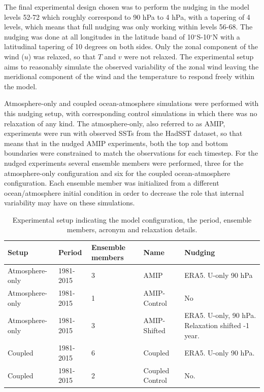 
The final experimental design chosen was to perform the nudging in the model levels 52-72 which roughly correspond to 90 hPa to 4 hPa, with a tapering of 4 levels, which means that full nudging was only working within levels 56-68. The nudging was done at all longitudes in the latitude band of 10$^\circ$S-10$^\circ$N with a latitudinal tapering of 10 degrees on both sides. Only the zonal component of the wind ($u$) was relaxed, so that $T$ and $v$ were not relaxed. 
The experimental setup aims to reasonably simulate the observed variability of the zonal wind leaving the meridional component of the wind and the temperature to respond freely within the model. 

Atmosphere-only and coupled ocean-atmosphere simulations were performed with this nudging setup, with corresponding control simulations in which there was no relaxation of any kind. The atmosphere-only, also referred to as AMIP, experiments were run with observed SSTs from the HadSST dataset, so that means that in the nudged AMIP experiments, both the top and bottom boundaries were constrained to match the observations for each timestep. 
For the nudged experiments several ensemble members were performed, three for the atmosphere-only configuration and six for the coupled ocean-atmosphere configuration. Each ensemble member was initialized from a different ocean/atmosphere initial condition in order to decrease the role that internal variability may have on these simulations. 

\begin{table}[t!]
\caption{Experimental setup indicating the model configuration, the period, ensemble members, acronym and relaxation details.}
\begin{tabular}{p{2.3cm}|p{2.3cm}|p{1.73cm}|p{3cm}|p{5cm}}
Setup           & Period    & Ensemble members & Name            & Nudging                                          \\ \hline \hline
Atmosphere-only & 1981-2015 & 3                & AMIP            & ERA5. U-only 90 hPa                              \\
Atmosphere-only & 1981-2015 & 1                & AMIP-Control    & No                                               \\
Atmosphere-only & 1981-2015 & 3                & AMIP-Shifted    & ERA5. U-only, 90 hPa. Relaxation shifted -1 year. \\
Coupled         & 1981-2015 & 6                & Coupled         & ERA5. U-only 90 hPa.                             \\
Coupled         & 1981-2015 & 2                & Coupled Control & No.                                             
\end{tabular}
\end{table}


